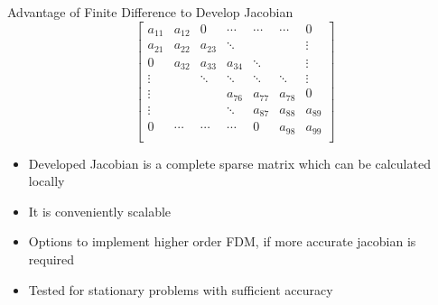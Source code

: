 \begin{frame}{Advantage of Finite Difference to Develop Jacobian}
\begin{equation}
\begin{bmatrix}
a_{11}  & a_{12}  & 0  & \cdots & \cdots & \cdots & 0 \\
a_{21}  & a_{22}  & a_{23}  & \ddots & &&  \vdots \\
0 & a_{32}  & a_{33} & a_{34}  & \ddots &   & \vdots \\
\vdots & & \ddots & \ddots & \ddots & \ddots& \vdots\\
\vdots  &   &  & a_{76}  & a_{77}  &  a_{78}  & 0\\
\vdots  &   & & \ddots & a_{87}  & a_{88}  &  a_{89}\\
0 & \cdots &  \cdots & \cdots & 0 & a_{98} & a_{99}  \\
\end{bmatrix}
\end{equation}
\normalsize
\begin{itemize}
\item Developed Jacobian is a complete sparse matrix which can be calculated locally
\item It is conveniently scalable
\item Options to implement higher order FDM, if more accurate jacobian is required
\item Tested for stationary problems with sufficient accuracy
\end{itemize}
\end{frame}


%
%
%

